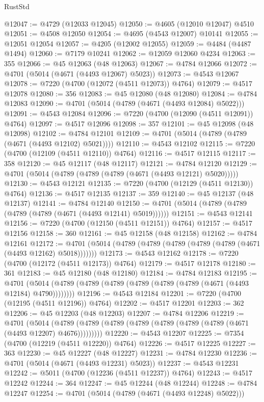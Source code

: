 \begin{lexlean}{RustStd}
\begin{coremodule}
@12047 := @4729 (@12033 @12045)
@12050 := @4605 (@12010 @12047) @4510
@12051 := @4508 @12050
@12054 := @4695 (@4543 @12007) @10141
@12055 := @12051 @12054
@12057 := @4205 (@12002 @12055)
@12059 := @4484 (@4487 @1494)
@12060 := @7179 @10241
@12062 := @12059 @12060 @4234
@12063 := 355
@12066 := @45 @12063 (@48 @12063)
@12067 := @4784 @12066
@12072 := @4701 (@5014 (@4671 (@4493 @12067) @5023))
@12073 := @4543 @12067
@12078 := @7220 (@4700 (@12072 (@4511 @12073)) @4764)
@12079 := @4517 @12078
@12080 := 356
@12083 := @45 @12080 (@48 @12080)
@12084 := @4784 @12083
@12090 := @4701 (@5014 (@4789 (@4671 (@4493 @12084) @5022)))
@12091 := @4543 @12084
@12096 := @7220 (@4700 (@12090 (@4511 @12091)) @4764)
@12097 := @4517 @12096
@12098 := 357
@12101 := @45 @12098 (@48 @12098)
@12102 := @4784 @12101
@12109 := @4701 (@5014 (@4789 (@4789 (@4671 (@4493 @12102) @5021))))
@12110 := @4543 @12102
@12115 := @7220 (@4700 (@12109 (@4511 @12110)) @4764)
@12116 := @4517 @12115
@12117 := 358
@12120 := @45 @12117 (@48 @12117)
@12121 := @4784 @12120
@12129 := @4701 (@5014 (@4789 (@4789 (@4789 (@4671 (@4493 @12121) @5020)))))
@12130 := @4543 @12121
@12135 := @7220 (@4700 (@12129 (@4511 @12130)) @4764)
@12136 := @4517 @12135
@12137 := 359
@12140 := @45 @12137 (@48 @12137)
@12141 := @4784 @12140
@12150 := @4701 (@5014 (@4789 (@4789 (@4789 (@4789 (@4671 (@4493 @12141) @5019))))))
@12151 := @4543 @12141
@12156 := @7220 (@4700 (@12150 (@4511 @12151)) @4764)
@12157 := @4517 @12156
@12158 := 360
@12161 := @45 @12158 (@48 @12158)
@12162 := @4784 @12161
@12172 := @4701 (@5014 (@4789 (@4789 (@4789 (@4789 (@4789 (@4671 (@4493 @12162) @5018)))))))
@12173 := @4543 @12162
@12178 := @7220 (@4700 (@12172 (@4511 @12173)) @4764)
@12179 := @4517 @12178
@12180 := 361
@12183 := @45 @12180 (@48 @12180)
@12184 := @4784 @12183
@12195 := @4701 (@5014 (@4789 (@4789 (@4789 (@4789 (@4789 (@4789 (@4671 (@4493 @12184) @4790))))))))
@12196 := @4543 @12184
@12201 := @7220 (@4700 (@12195 (@4511 @12196)) @4764)
@12202 := @4517 @12201
@12203 := 362
@12206 := @45 @12203 (@48 @12203)
@12207 := @4784 @12206
@12219 := @4701
    (@5014 (@4789 (@4789 (@4789 (@4789 (@4789 (@4789 (@4789 (@4671 (@4493 @12207) @4676)))))))))
@12220 := @4543 @12207
@12225 := @7354 (@4700 (@12219 (@4511 @12220)) @4764)
@12226 := @4517 @12225
@12227 := 363
@12230 := @45 @12227 (@48 @12227)
@12231 := @4784 @12230
@12236 := @4701 (@5014 (@4671 (@4493 @12231) @5023))
@12237 := @4543 @12231
@12242 := @5011 (@4700 (@12236 (@4511 @12237)) @4764)
@12243 := @4517 @12242
@12244 := 364
@12247 := @45 @12244 (@48 @12244)
@12248 := @4784 @12247
@12254 := @4701 (@5014 (@4789 (@4671 (@4493 @12248) @5022)))

\end{coremodule}
\end{lexlean}
